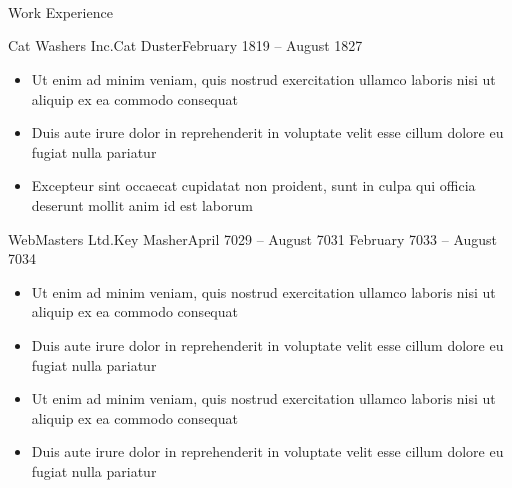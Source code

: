 \documentclass{../classes/resume}
\begin{document}
	\begin{header}
	    \\
	    \address{1234 Fake St, City, XX A1A 1A1}\\
        \\
	\end{header}
	
	
	\begin{section}{Work Experience}
        \begin{subsection}{Cat Washers Inc.\divider Cat Duster}{February 1819 -- August 1827}
            \begin{itemize}
                \item Ut enim ad minim veniam, quis nostrud exercitation ullamco laboris nisi ut aliquip ex ea commodo consequat
                \item Duis aute irure dolor in reprehenderit in voluptate velit esse cillum dolore eu fugiat nulla pariatur
                \item Excepteur sint occaecat cupidatat non proident, sunt in culpa qui officia deserunt mollit anim id est laborum
            \end{itemize}
		\end{subsection}	
	
        \begin{subsection}{WebMasters Ltd.\divider Key Masher}{April 7029 -- August 7031 \divider February 7033 -- August 7034}
			\begin{itemize}
                \item Ut enim ad minim veniam, quis nostrud exercitation ullamco laboris nisi ut aliquip ex ea commodo consequat
                \item Duis aute irure dolor in reprehenderit in voluptate velit esse cillum dolore eu fugiat nulla pariatur
                \item Ut enim ad minim veniam, quis nostrud exercitation ullamco laboris nisi ut aliquip ex ea commodo consequat
                \item Duis aute irure dolor in reprehenderit in voluptate velit esse cillum dolore eu fugiat nulla pariatur
			\end{itemize}
		\end{subsection}
	\end{section}
\end{document}
